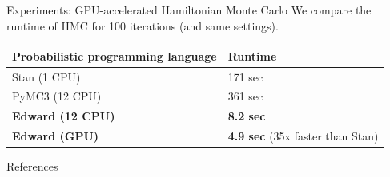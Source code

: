 \documentclass[final]{beamer}
\begin{document}
\begin{frame}[t]
\begin{columns}[t]
\begin{column}{\onecolwid}
\begin{block}{Experiments: GPU-accelerated Hamiltonian Monte Carlo}
We compare the runtime of HMC for 100 iterations (and same settings).
\begin{table}[tb]
\centering
\begin{tabular}{ll}
\toprule
Probabilistic programming language & Runtime
\\
\midrule
Stan (1 CPU) \citep{carpenter2016stan} & 171 sec \\
PyMC3 (12 CPU) \citep{salvatier2015probabilistic} & 361 sec \\
\textbf{Edward (12 CPU)} & \textbf{8.2 sec} \\
\textbf{Edward (GPU)} & \textbf{4.9 sec} (35x faster than Stan)\\
\bottomrule
\end{tabular}
\end{table}
\end{block}

\vspace{-2ex}
\begin{block}{References}
\small{
\vspace{0.75in}}
\end{block}

\end{column}

\begin{column}{\sepwid}\end{column} %

\end{columns} %
\end{frame}   %
\end{document}

